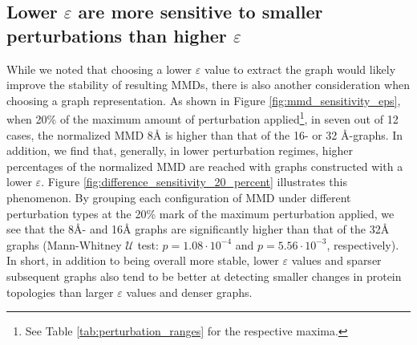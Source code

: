 \subsection{Lower $\varepsilon$ are more sensitive to smaller perturbations than
higher $\varepsilon$} While we noted that choosing a lower $\varepsilon$ value
to extract the graph would likely improve the stability of resulting MMDs, there
is also another consideration when choosing a graph representation. As shown in
Figure \ref{fig:mmd_sensitivity_eps}, when 20\% of the maximum amount of
perturbation applied\footnote{See Table \ref{tab:perturbation_ranges} for the
respective maxima.}, in seven out of 12 cases, the normalized MMD
8\si{\angstrom} is higher than that of the 16- or 32 \si{\angstrom}-graphs. In
addition, we find that, generally, in lower perturbation regimes, higher
percentages of the normalized MMD are reached with graphs constructed with a
lower $\varepsilon$. Figure \ref{fig:difference_sensitivity_20_percent}
illustrates this phenomenon. By grouping each configuration of MMD under
different perturbation types at the 20\% mark of the maximum perturbation
applied, we see that the 8\si{\angstrom}- and 16\si{\angstrom} graphs are
significantly higher than that of the 32\si{\angstrom} graphs (Mann-Whitney
$\mathcal{U}$ test: $p=1.08\cdot 10^{-4}$ and $p=5.56\cdot 10^{-3}$,
respectively). In short, in addition to being overall more stable, lower
$\varepsilon$ values and sparser subsequent graphs also tend to be better at
detecting smaller changes in protein topologies than larger $\varepsilon$ values
and denser graphs.


